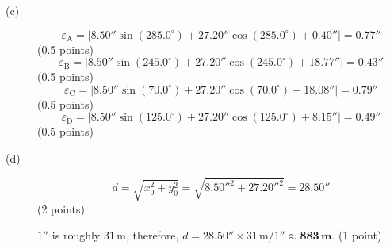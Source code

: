 \begin{description}
\item[(c)]
  \[
  \varepsilon_{\mathrm{A}} = \left|8.50''\sin(285.0^\circ)
    + 27.20''\cos(285.0^\circ) + 0.40''\right| = \mathbf{0.77''}
  \]
  \hfill(0.5 points)
  \[
  \varepsilon_{\mathrm{B}} = \left|8.50''\sin(245.0^\circ)
    + 27.20''\cos(245.0^\circ) + 18.77''\right| = \mathbf{0.43''}
  \]
  \hfill(0.5 points)
  \[
  \varepsilon_{\mathrm{C}} = \left|8.50''\sin(70.0^\circ)
    + 27.20''\cos(70.0^\circ) - 18.08''\right| = \mathbf{0.79''}
  \]
  \hfill(0.5 points)
  \[
  \varepsilon_{\mathrm{D}} = \left|8.50''\sin(125.0^\circ)
    + 27.20''\cos(125.0^\circ) + 8.15''\right| = \mathbf{0.49''}
  \]
  \hfill(0.5 points)

\item[(d)]
  \[
  d = \sqrt{x_0^2 + y_0^2} = \sqrt{8.50''^2 + 27.20''^2} = \mathbf{28.50''}
  \]
  \hfill(2 points)

  $1''$ is roughly $31\,\mathrm{m}$, therefore,
  $d = 28.50'' \times 31\,\mathrm{m}/1'' \approx \mathbf{883\,m}$.
  \hfill(1 point)
\end{description}

